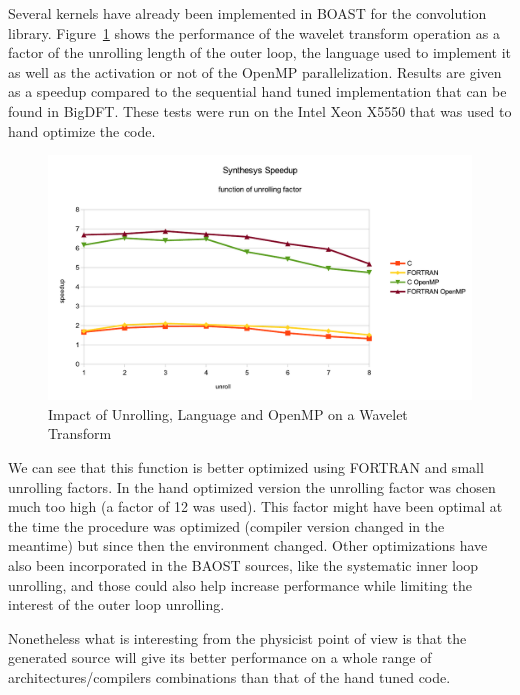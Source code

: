 \documentclass[11pt, a4paper, twoside]{montblanc}
\begin{document}
Several kernels have already been implemented in BOAST for the convolution
library. Figure~\ref{fig:synthesis} shows the performance of the wavelet
transform operation as a factor of the unrolling length of the outer loop, the
language used to implement it as well as the activation or not of the OpenMP
parallelization. Results are given as a speedup compared to the sequential hand
tuned implementation that can be found in BigDFT. These tests were run on the
Intel Xeon X5550 that was used to hand optimize the code.

\begin{figure}
\begin{center}
\includegraphics[scale=0.7]{Res_synthesis}
\end{center}
\caption{Impact of Unrolling, Language and OpenMP on a Wavelet Transform}
\label{fig:synthesis}
\end{figure}

We can see that this function is better optimized using FORTRAN and small
unrolling factors. In the hand optimized version the unrolling factor was chosen
much too high (a factor of 12 was used). This factor might have been optimal at
the time the procedure was optimized (compiler version changed in the meantime) but
since then the environment changed. Other optimizations have also been
incorporated in the BAOST sources, like the systematic inner loop unrolling, and
those could also help increase performance while limiting the interest of the
outer loop unrolling.

Nonetheless what is interesting from the physicist point of view is that the
generated source will give its better performance on a whole range of
architectures/compilers combinations than that of the hand tuned code.
\end{document}
